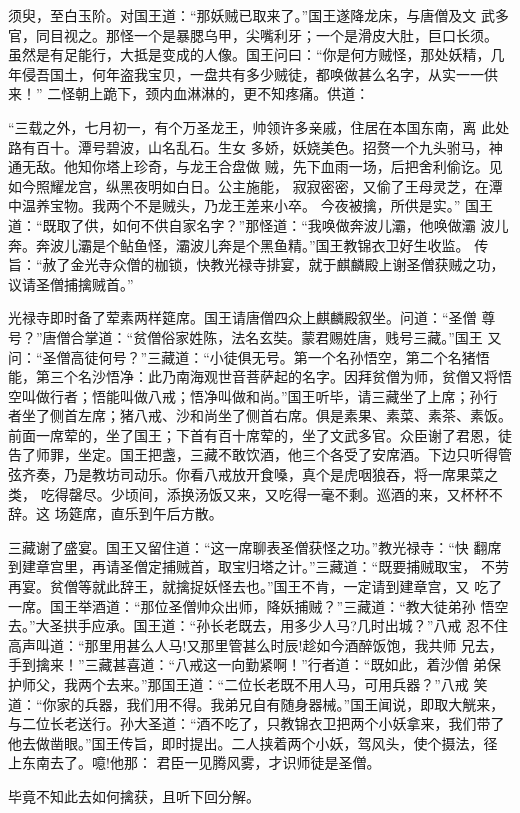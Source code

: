 须臾，至白玉阶。对国王道：“那妖贼已取来了。”国王遂降龙床，与唐僧及文
武多官，同目视之。那怪一个是暴腮乌甲，尖嘴利牙；一个是滑皮大肚，巨口长须。
虽然是有足能行，大抵是变成的人像。国王问曰：“你是何方贼怪，那处妖精，几
年侵吾国土，何年盗我宝贝，一盘共有多少贼徒，都唤做甚么名字，从实一一供来！”
二怪朝上跪下，颈内血淋淋的，更不知疼痛。供道：

“三载之外，七月初一，有个万圣龙王，帅领许多亲戚，住居在本国东南，离
此处路有百十。潭号碧波，山名乱石。生女
多娇，妖娆美色。招赘一个九头驸马，神通无敌。他知你塔上珍奇，与龙王合盘做
贼，先下血雨一场，后把舍利偷讫。见如今照耀龙宫，纵黑夜明如白日。公主施能，
寂寂密密，又偷了王母灵芝，在潭中温养宝物。我两个不是贼头，乃龙王差来小卒。
今夜被擒，所供是实。”
国王道：“既取了供，如何不供自家名字？”那怪道：“我唤做奔波儿灞，他唤做灞
波儿奔。奔波儿灞是个鲇鱼怪，灞波儿奔是个黑鱼精。”国王教锦衣卫好生收监。
传旨：“赦了金光寺众僧的枷锁，快教光禄寺排宴，就于麒麟殿上谢圣僧获贼之功，
议请圣僧捕擒贼首。”

光禄寺即时备了荤素两样筵席。国王请唐僧四众上麒麟殿叙坐。问道：“圣僧
尊号？”唐僧合掌道：“贫僧俗家姓陈，法名玄奘。蒙君赐姓唐，贱号三藏。”国王
又问：“圣僧高徒何号？”三藏道：“小徒俱无号。第一个名孙悟空，第二个名猪悟
能，第三个名沙悟净：此乃南海观世音菩萨起的名字。因拜贫僧为师，贫僧又将悟
空叫做行者；悟能叫做八戒；悟净叫做和尚。”国王听毕，请三藏坐了上席；孙行
者坐了侧首左席；猪八戒、沙和尚坐了侧首右席。俱是素果、素菜、素茶、素饭。
前面一席荤的，坐了国王；下首有百十席荤的，坐了文武多官。众臣谢了君恩，徒
告了师罪，坐定。国王把盏，三藏不敢饮酒，他三个各受了安席酒。下边只听得管
弦齐奏，乃是教坊司动乐。你看八戒放开食嗓，真个是虎咽狼吞，将一席果菜之类，
吃得罄尽。少顷间，添换汤饭又来，又吃得一毫不剩。巡酒的来，又杯杯不辞。这
场筵席，直乐到午后方散。

三藏谢了盛宴。国王又留住道：“这一席聊表圣僧获怪之功。”教光禄寺：“快
翻席到建章宫里，再请圣僧定捕贼首，取宝归塔之计。”三藏道：“既要捕贼取宝，
不劳再宴。贫僧等就此辞王，就擒捉妖怪去也。”国王不肯，一定请到建章宫，又
吃了一席。国王举酒道：“那位圣僧帅众出师，降妖捕贼？”三藏道：“教大徒弟孙
悟空去。”大圣拱手应承。国王道：“孙长老既去，用多少人马?几时出城？”八戒
忍不住高声叫道：“那里用甚么人马!又那里管甚么时辰!趁如今酒醉饭饱，我共师
兄去，手到擒来！”三藏甚喜道：“八戒这一向勤紧啊！”行者道：“既如此，着沙僧
弟保护师父，我两个去来。”那国王道：“二位长老既不用人马，可用兵器？”八戒
笑道：“你家的兵器，我们用不得。我弟兄自有随身器械。”国王闻说，即取大觥来，
与二位长老送行。孙大圣道：“酒不吃了，只教锦衣卫把两个小妖拿来，我们带了
他去做凿眼。”国王传旨，即时提出。二人挟着两个小妖，驾风头，使个摄法，径
上东南去了。噫!他那：
君臣一见腾风雾，才识师徒是圣僧。

毕竟不知此去如何擒获，且听下回分解。